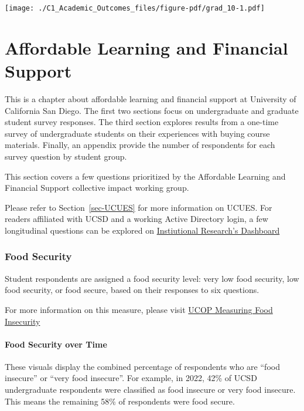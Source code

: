 \documentclass[
  letterpaper,
  DIV=11,
  numbers=noendperiod]{scrreprt}
\begin{document}
\texttt{[image: ./C1\_Academic\_Outcomes\_files/figure-pdf/grad\_10-1.pdf]}


\hypertarget{affordable-learning-and-financial-support}{%
\chapter{Affordable Learning and Financial
Support}\label{affordable-learning-and-financial-support}}

This is a chapter about affordable learning and financial support at
University of California San Diego. The first two sections focus on
undergraduate and graduate student survey responses. The third section
explores results from a one-time survey of undergraduate students on
their experiences with buying course materials. Finally, an appendix
provide the number of respondents for each survey question by student
group.

This section covers a few questions prioritized by the Affordable
Learning and Financial Support collective impact working group.

Please refer to Section~\ref{sec-UCUES} for more information on UCUES.
For readers affiliated with UCSD and a working Active Directory login, a
few longitudinal questions can be explored on
\href{https://tableau.ucsd.edu/\#/views/UCUES_UC_SanDiego/Affordability?:iid=1}{Instiutional
Research's Dashboard}

\hypertarget{food-security}{%
\subsection{Food Security}\label{food-security}}

Student respondents are assigned a food security level: very low food
security, low food security, or food secure, based on their responses to
six questions.

For more information on this measure, please visit
\href{https://www.universityofcalifornia.edu/sites/default/files/measuring-food-insecurity.pdf}{UCOP
Measuring Food Insecurity}

\hypertarget{food-security-over-time}{%
\subsubsection{Food Security over Time}\label{food-security-over-time}}

These visuals display the combined percentage of respondents who are
``food insecure'' or ``very food insecure''. For example, in 2022, 42\%
of UCSD undergraduate respondents were classified as food insecure or
very food insecure. This means the remaining 58\% of respondents were
food secure.
\end{document}
